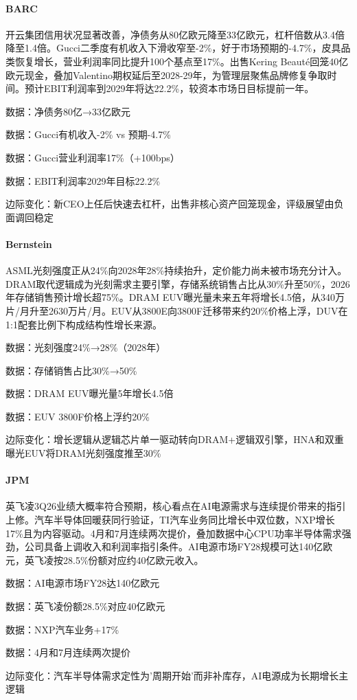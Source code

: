 \documentclass[11pt]{ctexart}
\begin{document}
\paragraph{BARC} 开云集团信用状况显著改善，净债务从80亿欧元降至33亿欧元，杠杆倍数从3.4倍降至1.4倍。Gucci二季度有机收入下滑收窄至-2\%，好于市场预期的-4.7\%，皮具品类恢复增长，营业利润率同比提升100个基点至17\%。出售Kering Beauté回笼40亿欧元现金，叠加Valentino期权延后至2028-29年，为管理层聚焦品牌修复争取时间。预计EBIT利润率到2029年将达22.2\%，较资本市场日目标提前一年。
{\small\color{refgray}数据：净债务80亿→33亿欧元\par}
{\small\color{refgray}数据：Gucci有机收入-2\% vs 预期-4.7\%\par}
{\small\color{refgray}数据：Gucci营业利润率17\%（+100bps）\par}
{\small\color{refgray}数据：EBIT利润率2029年目标22.2\%\par}
{\small\color{refgray}边际变化：新CEO上任后快速去杠杆，出售非核心资产回笼现金，评级展望由负面调回稳定\par}
\paragraph{Bernstein} ASML光刻强度正从24\%向2028年28\%持续抬升，定价能力尚未被市场充分计入。DRAM取代逻辑成为光刻需求主要引擎，存储系统销售占比从30\%升至50\%，2026年存储销售预计增长超75\%。DRAM EUV曝光量未来五年将增长4.5倍，从340万片/月升至2630万片/月。EUV从3800E向3800F迁移带来约20\%价格上浮，DUV在1:1配套比例下构成结构性增长来源。
{\small\color{refgray}数据：光刻强度24\%→28\%（2028年）\par}
{\small\color{refgray}数据：存储销售占比30\%→50\%\par}
{\small\color{refgray}数据：DRAM EUV曝光量5年增长4.5倍\par}
{\small\color{refgray}数据：EUV 3800F价格上浮约20\%\par}
{\small\color{refgray}边际变化：增长逻辑从逻辑芯片单一驱动转向DRAM+逻辑双引擎，HNA和双重曝光EUV将DRAM光刻强度推至30\%\par}
\paragraph{JPM} 英飞凌3Q26业绩大概率符合预期，核心看点在AI电源需求与连续提价带来的指引上修。汽车半导体回暖获同行验证，TI汽车业务同比增长中双位数，NXP增长17\%且为内容驱动。4月和7月连续两次提价，叠加数据中心CPU功率半导体需求强劲，公司具备上调收入和利润率指引条件。AI电源市场FY28规模可达140亿欧元，英飞凌按28.5\%份额对应约40亿欧元收入。
{\small\color{refgray}数据：AI电源市场FY28达140亿欧元\par}
{\small\color{refgray}数据：英飞凌份额28.5\%对应40亿欧元\par}
{\small\color{refgray}数据：NXP汽车业务+17\%\par}
{\small\color{refgray}数据：4月和7月连续两次提价\par}
{\small\color{refgray}边际变化：汽车半导体需求定性为'周期开始'而非补库存，AI电源成为长期增长主逻辑\par}
\end{document}
